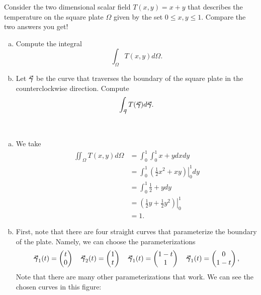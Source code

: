 \documentclass[12pt]{article} %
\begin{document}
\newpage
\begin{problem}
Consider the two dimensional scalar field $T(x,y)=x+y$ that describes the temperature on the square plate $\Omega$ given by the set $0\leq x,y \leq 1$.  Compare the two answers you get!
\begin{enumerate}[(a)]
	\item Compute the integral
	\[
	\int_\Omega T(x,y)d\Omega.
	\]
	\item Let $\boldsymbol{\vec{\gamma}}$ be the curve that traverses the boundary of the square plate in the counterclockwise direction.  Compute
	\[
	\int_{\boldsymbol{\vec{\gamma}}} T(\boldsymbol{\vec{\gamma}})d\boldsymbol{\vec{\gamma}}. 
	\]
\end{enumerate}
\end{problem}
\begin{solution} ~
	\begin{enumerate}[(a)]
		\item We take
		\begin{align*}
			\iint_\Omega T(x,y)d\Omega &= \int_0^1 \int_0^1 x+y dxdy\\
			&= \int_0^1 \left.\left(\frac{1}{2}x^2+xy\right)\right\vert_0^1 dy\\
			&= \int_0^1 \frac{1}{2} + y dy\\
			&= \left.\left(\frac{1}{2}y + \frac{1}{2}y^2\right)\right\vert_0^1\\
			&= 1.
		\end{align*}
		\item	First, note that there are four straight curves that parameterize the boundary of the plate.  Namely, we can choose the parameterizations 
		\[
		\boldsymbol{\vec{\gamma}}_1(t) = \begin{pmatrix} t \\ 0 \end{pmatrix} \quad \boldsymbol{\vec{\gamma}}_2(t) = \begin{pmatrix} 1 \\ t \end{pmatrix} \quad \boldsymbol{\vec{\gamma}}_1(t) = \begin{pmatrix} 1-t \\ 1 \end{pmatrix} \quad \boldsymbol{\vec{\gamma}}_1(t) = \begin{pmatrix} 0 \\ 1-t \end{pmatrix},
		\]
		Note that there are many other parameterizations that work. We can see the chosen curves in this figure:
		\begin{figure}[H]
			\centering

\end{figure}
\end{enumerate}
\end{solution}
\end{document}
